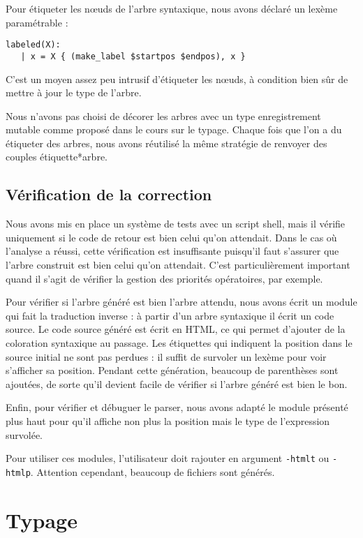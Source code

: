 \documentclass[a4paper]{article}
\begin{document}
Pour étiqueter les nœuds de l'arbre syntaxique, nous avons déclaré un lexème paramétrable :

\begin{verbatim}
labeled(X):
   | x = X { (make_label $startpos $endpos), x }
\end{verbatim}

C'est un moyen assez peu intrusif d'étiqueter les nœuds, à condition bien sûr de mettre à jour le type de l'arbre.

Nous n'avons pas choisi de décorer les arbres avec un type
 enregistrement mutable comme proposé dans le cours sur le typage.
Chaque fois que l'on a du étiqueter des arbres, nous avons réutilisé la
même stratégie de renvoyer des couples étiquette*arbre.

\subsection{Vérification de la correction}
\label{subsec:html}

Nous avons mis en place un système de tests avec un script shell, mais il vérifie uniquement si le code de retour est bien celui qu'on attendait.
Dans le cas où l'analyse a réussi, cette vérification est insuffisante puisqu'il faut s'assurer que l'arbre construit est bien celui qu'on attendait.
C'est particulièrement important quand il s'agit de vérifier la gestion des priorités opératoires, par exemple.

Pour vérifier si l'arbre généré est bien l'arbre attendu, nous avons écrit un module qui fait la traduction inverse :
à partir d'un arbre syntaxique il écrit un code source.
Le code source généré est écrit en HTML, ce qui permet d'ajouter de la coloration syntaxique au passage.
Les étiquettes qui indiquent la position dans le source initial ne sont pas perdues :
il suffit de survoler un lexème pour voir s'afficher sa position.
Pendant cette génération, beaucoup de parenthèses sont ajoutées, de sorte qu'il devient facile de vérifier si l'arbre généré est bien le bon.

Enfin, pour vérifier et débuguer le parser, nous avons adapté le module
présenté plus haut pour qu'il affiche non plus la position mais le type
de l'expression survolée.

Pour utiliser ces modules, l'utilisateur doit rajouter en argument
\texttt{-htmlt} ou \texttt{-htmlp}. Attention cependant, beaucoup de
fichiers sont générés.

\section{Typage}
\end{document}
